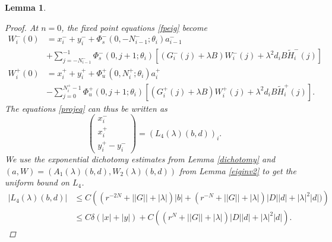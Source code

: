 \documentclass[12pt]{article}
\newtheorem{lemma}{Lemma}
\begin{document}
\begin{lemma}
\begin{proof}
At $n = 0$, the fixed point equations \eqref{fpeig} become 
\begin{align*}
W_i^-(0) &= x_i^- + y_i^- +
\Phi_s^-(0, -N_{i-1}^-; \theta_i) a_{i-1}^- \\
&+ \sum_{j = -N_{i-1}^-}^{-1} \Phi_s^-(0, j+1; \theta_i)
[(G_i^-(j) + \lambda B) W_i^-(j) + \lambda^2 d_i B \tilde{H}_i^-(j)] \\
W_i^+(0) &= x_i^+ + y_i^+ + \Phi_u^+(0, N_i^+; \theta_i) a_i^+ \\
&- \sum_{j = 0}^{N_i^+-1} \Phi_u^+(0, j+1; \theta_i) 
[(G_i^+(j) + \lambda B) W_i^+(j) + \lambda^2 d_i B \tilde{H}_i^+(j)].
\end{align*}
The equations \eqref{projeq} can thus be written as
\begin{equation}\label{projeq2}
\begin{pmatrix}
x_i^- \\ x_i^+ \\ y_i^+ - y_i^-
\end{pmatrix}
= (L_4(\lambda)(b,d))_i.
\end{equation}
We use the exponential dichotomy estimates from Lemma \ref{dichotomy} and $(a, W) = (A_1(\lambda)(b,d), W_2(\lambda)(b,d))$ from Lemma \ref{eiginv2} to get the uniform bound on $L_4$.
\begin{align*}
|L_4(\lambda)(b,d)| 
&\leq C \left( (r^{-2N} + ||G|| + |\lambda|)|b| + 
(r^{-N} + ||G|| + |\lambda|)|D| |d| + |\lambda|^2 |d| )
\right) \\
&\leq C \delta(|x| + |y|) + C \left( (r^{N} + ||G|| + |\lambda|)|D| |d| + |\lambda|^2 |d| \right).
\end{align*}


\end{proof}
\end{lemma}
\end{document}
